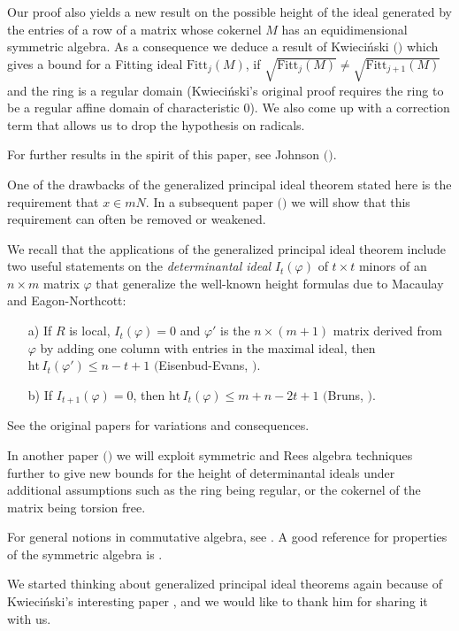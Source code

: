 \documentclass{proc-l}
\newcommand{\Fitt}{\mathrm{Fitt}}
\newcommand{\hgt}{\mathrm{ht}}
\theoremstyle{remark}
\theoremstyle{definition}
\begin{document}
Our proof also yields a new result on the possible height of the ideal
generated by the entries of a row of a matrix whose cokernel $M$ has an
equidimensional symmetric algebra. As a consequence we deduce a result
of Kwieci\'nski $($\cite{K}$)$ which gives a bound for a Fitting ideal
$\Fitt_j(M)$, if
$\sqrt{\Fitt_j(M)}\neq \sqrt{\Fitt_{j+1}(M)}$  and the ring is a regular domain 
(Kwieci\'nski's original
proof requires the ring to be a regular affine domain of
characteristic 0).  We also come up with a correction term that allows us to
drop the hypothesis on radicals. 

For further results in the spirit of this paper, see
Johnson $($\cite{J}$)$.

One of the drawbacks of the generalized principal ideal theorem
stated here is the requirement that $x\in mN$. In a subsequent
paper $($\cite{EHU1}$)$ we will show that this requirement can often
be removed or weakened. 

We recall that the applications of the generalized principal ideal
theorem include two useful statements on the {\it determinantal ideal\/}
$I_t(\varphi)$ of $t\times t$ minors of an $n\times m$ matrix
$\varphi$ that generalize the well-known height formulas due to Macaulay
and Eagon-Northcott:

\begin{itemize}
\item[a)] 
If $R$ is local, $I_{t}(\varphi)= 0$ and
$\varphi'$ is the $n\times (m+1)$ matrix derived from
$\varphi$ by adding one column with entries in the maximal ideal, then
$\hgt \, I_{t}(\varphi') \leq n-t+1$ $($Eisenbud-Evans, \cite{EE}$)$.

\item[b)] 
If $I_{t+1}(\varphi) = 0$, then $\hgt \, I_{t}(\varphi) \leq m+n-2t+1$ 
$($Bruns, \cite{B}$)$.
\end{itemize}
See the original papers for variations and consequences.


In another paper $($\cite{EHU2}$)$ we will exploit 
symmetric and Rees algebra techniques further to give new bounds
for the height of determinantal ideals under additional
assumptions such as the ring being regular, or the
cokernel of the matrix being torsion free.

For general notions in commutative algebra, see \cite{E}.
A good reference for properties of the symmetric algebra is
\cite{V}.

We started thinking about generalized principal ideal
theorems again because of Kwieci\'nski's interesting
paper \cite{K}, and we would like to thank him for 
sharing it with us.
\end{document}
